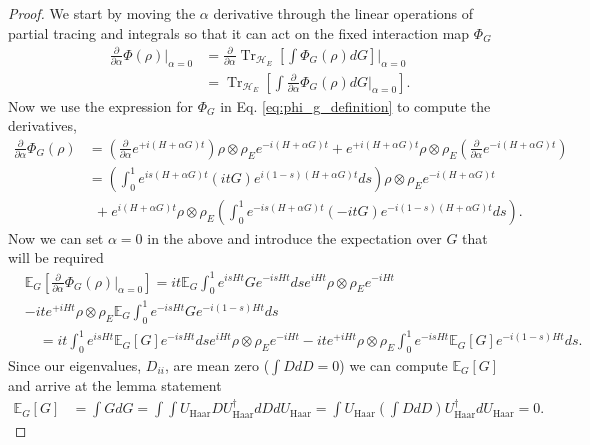 \documentclass[
 amsmath,amssymb,
 aps,
onecolumn, 
nofootinbib]{revtex4-2}
\newcommand{\haar}{\text{Haar}}
\newcommand{\parens}[1]{\left( #1 \right)}
\newcommand{\brackets}[1]{\left[ #1 \right]}
\DeclareMathOperator{\Tr}{Tr}
\newcommand{\partrace}[2]{\Tr_{#1} \brackets{ #2 }}
\begin{document}
\begin{proof}
    We start by moving the $\alpha$ derivative through the linear operations of partial tracing and integrals so that it can act on the fixed interaction map $\Phi_G$
    \begin{align}
        \frac{\partial}{\partial \alpha} \Phi(\rho) \bigg|_{\alpha = 0} &= \frac{\partial}{\partial \alpha} \partrace{\mathcal{H}_E}{\int \Phi_G(\rho) dG} \bigg|_{\alpha = 0} \\
         &= \partrace{\mathcal{H}_E}{\int \frac{\partial}{\partial \alpha} \Phi_G(\rho) dG \bigg|_{\alpha = 0} } .
    \end{align}
    Now we use the expression for $\Phi_G$ in Eq. \eqref{eq:phi_g_definition} to compute the derivatives,
    \begin{align}
        \frac{\partial}{\partial \alpha} \Phi_G (\rho) &= \parens{\frac{\partial}{\partial \alpha} e^{+ i (H + \alpha G)t}} \rho \otimes \rho_E e^{-i (H + \alpha G) t} + e^{+i (H + \alpha G)t} \rho \otimes \rho_E \parens{\frac{\partial}{\partial \alpha} e^{- i (H + \alpha G)t}} \\
        &= \parens{\int_{0}^{1} e^{i s (H+\alpha G)t} (i t G) e^{i (1-s) (H+\alpha G)t} ds} \rho \otimes \rho_E e^{-i(H+\alpha G)t} \nonumber \\
    &~ ~+ e^{i(H+\alpha G)t} \rho \otimes \rho_E \parens{\int_{0}^1 e^{-i s (H+\alpha G) t} (- i t G) e^{-i (1-s) (H+\alpha G)t} ds}. \label{eq:first_order_alpha_derivative}
    \end{align}
    Now we can set $\alpha = 0$ in the above and introduce the expectation over $G$ that will be required
    \begin{align}
        &\mathbb{E}_G\left[ \frac{\partial}{\partial \alpha} \Phi_G(\rho) \bigg|_{\alpha = 0}\right] = i t \mathbb{E}_G \int_0^1 e^{i s H t} G e^{-i s H t} ds e^{i H t} \rho \otimes \rho_E e^{-i H t} \nonumber\\
&- i t e^{+i H t} \rho \otimes \rho_E \mathbb{E}_G \int_0^1 e^{-is H t} G e^{-i(1-s) Ht} ds \\ 
        &\quad= i t \int_0^1 e^{i s H t} \mathbb{E}_G[G] e^{-i s H t} ds e^{i H t} \rho \otimes \rho_E e^{-i H t} - i t e^{+i H t} \rho \otimes \rho_E \int_0^1 e^{-is H t} \mathbb{E}_G[G] e^{-i(1-s) Ht} ds.
    \end{align}
    Since our eigenvalues, $D_{ii}$, are mean zero ($\int D dD = 0$) we can compute $\mathbb{E}_G [G] $ and arrive at the lemma statement
    \begin{align}
        \mathbb{E}_G [G] &= \int G dG = \int \int U_{\haar} D U_{\haar}^\dagger dD dU_{\haar} = \int U_{\haar} \left( \int D dD \right) U_{\haar}^\dagger dU_{\haar} = 0.
    \end{align}
\end{proof}
\end{document}
